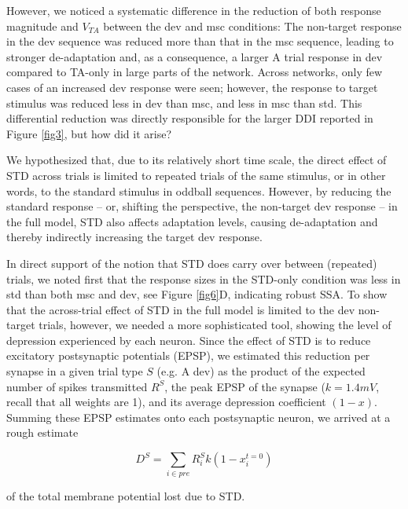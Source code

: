 \documentclass[pdflatex,iicol,sn-basic]{sn-jnl}
\theoremstyle{thmstyleone}%
\theoremstyle{thmstyletwo}%
\theoremstyle{thmstylethree}%
\begin{document}
However, we noticed a systematic difference in the reduction of both response magnitude and $V_{TA}$ between the dev and msc conditions: The non-target response in the dev sequence was reduced more than that in the msc sequence, leading to stronger de-adaptation and, as a consequence, a larger A trial response in dev compared to TA-only in large parts of the network. Across networks, only few cases of an increased dev response were seen; however, the response to target stimulus was reduced less in dev than msc, and less in msc than std. This differential reduction was directly responsible for the larger DDI reported in Figure \ref{fig3}, but how did it arise?

We hypothesized that, due to its relatively short time scale, the direct effect of STD across trials is limited to repeated trials of the same stimulus, or in other words, to the standard stimulus in oddball sequences. However, by reducing the standard response -- or, shifting the perspective, the non-target dev response -- in the full model, STD also affects adaptation levels, causing de-adaptation and thereby indirectly increasing the target dev response.

In direct support of the notion that STD does carry over between (repeated) trials, we noted first that the response sizes in the STD-only condition was less in std than both msc and dev, see Figure \ref{fig6}D, indicating robust SSA. To show that the across-trial effect of STD in the full model is limited to the dev non-target trials, however, we needed a more sophisticated tool, showing the level of depression experienced by each neuron. Since the effect of STD is to reduce excitatory postsynaptic potentials (EPSP), we estimated this reduction per synapse in a given trial type $S$ (e.g. A dev) as the product of the expected number of spikes transmitted $R^S$, the peak EPSP of the synapse ($k = 1.4 mV$, recall that all weights are 1), and its average depression coefficient $(1-x)$. Summing these EPSP estimates onto each postsynaptic neuron, we arrived at a rough estimate

\begin{equation}
    D^S = \sum_{i \in pre} R^S_i k (1-x_i^{t=0})
\end{equation}

of the total membrane potential lost due to STD.
\end{document}
